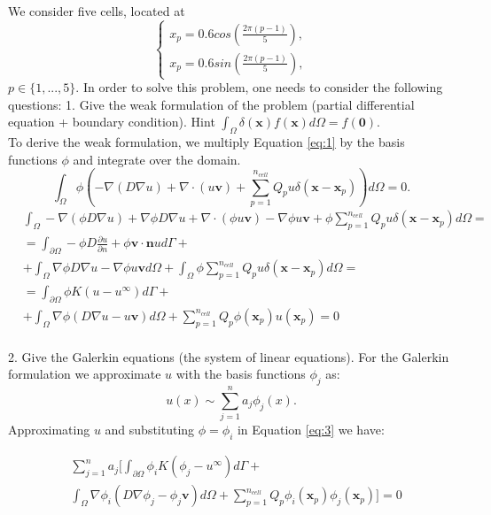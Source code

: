 \documentclass[a4paper,10pt]{report}
\begin{document}
We consider five cells, located at
\begin{equation*}
\begin{cases}
    x_p = 0.6 cos(\frac{2\pi(p − 1)}{5}),\\
     x_p = 0.6 sin(\frac{2\pi(p − 1)}{5}),
    \end{cases}
\end{equation*}
$p \in \{1, . . . , 5\}$. In order to solve this problem, one needs to consider the following
questions:
1. Give the weak formulation of the problem (partial differential equation +
boundary condition). Hint $\int_{\Omega }\delta (\mathbf{x}) f(\mathbf{x}) d \Omega =f(\mathbf{0})$.\\
To derive the weak formulation, we multiply Equation \eqref{eq:1} by the basis functions $\phi$ and integrate over the domain.\\
 \begin{equation}\label{eq:2}
 \int_{\Omega}\phi (-\nabla (D\nabla{u})+\nabla \cdot (u\mathbf{v}) +\sum_{p=1}^{n_{cell}}Q_pu\delta(\mathbf{x}-\mathbf{x}_p))d\Omega=0.
\end{equation}
  \begin{align}\label{eq:3}\nonumber
 &\int_{\Omega} -\nabla (\phi D\nabla{u})+\nabla\phi D\nabla{u}+ \nabla \cdot (\phi u\mathbf{v}) -\nabla \phi u\mathbf{v}+\phi \sum_{p=1}^{n_{cell}}Q_pu\delta(\mathbf{x}-\mathbf{x}_p) d\Omega=\\  \nonumber
  &=\int_{\partial\Omega} -\phi D\frac{\partial u}{\partial n}+\phi \mathbf{v}\cdot \mathbf{n}ud\Gamma +\\ \nonumber
  &+\int_{\Omega}\nabla\phi D\nabla{u}-\nabla\phi u\mathbf{v} d\Omega+\int_{\Omega}\phi \sum_{p=1}^{n_{cell}}Q_pu\delta(\mathbf{x}-\mathbf{x}_p) d\Omega=\\\nonumber
  &=\int_{\partial\Omega} \phi K(u-u^{\infty})d\Gamma +\\\nonumber
  &+\int_{\Omega}\nabla\phi (D\nabla{u}- u\mathbf{v}) d\Omega+\sum_{p=1}^{n_{cell}}Q_p\phi(\mathbf{x}_p) u(\mathbf{x}_p) =0\\
\end{align}

2. Give the Galerkin equations (the system of linear equations).
For the Galerkin formulation we approximate ${u}$ with the basis functions $\phi_j$ as:
$$u(x)\sim \sum_{j=1}^na_j\phi_j(x).$$
Approximating $u$ and substituting $\phi=\phi_i$ in Equation \eqref{eq:3} we have:


  \begin{align}\label{eq:4}\nonumber
  &\sum_{j=1}^{n}a_j [ \int_{\partial\Omega} \phi_i K(\phi_j-u^{\infty})d\Gamma +\\\nonumber
  &\int_{\Omega}\nabla\phi_i (D\nabla{\phi_j}- \phi_j\mathbf{v}) d\Omega+\sum_{p=1}^{n_{cell}}Q_p\phi_i(\mathbf{x}_p) \phi_j(\mathbf{x}_p)  ]=0 \\
\end{align}
\end{document}
